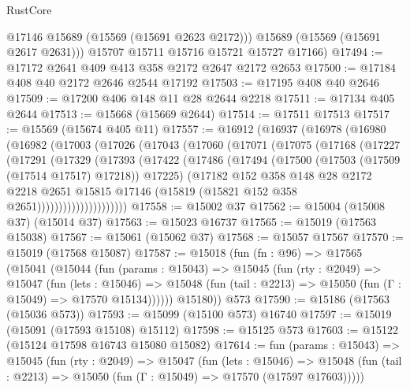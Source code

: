 \begin{lexlean}{RustCore}
\begin{coremodule}
          @17146
          @15689
          (@15569 (@15691 @2623 @2172)))
        @15689
        (@15569 (@15691 @2617 @2631)))
      @15707
      @15711
      @15716
      @15721
      @15727
      @17166)
@17494 := @17172 @2641 @409 @413 @358 @2172 @2647 @2172 @2653
@17500 := @17184 @408 @40 @2172 @2646 @2544 @17192
@17503 := @17195 @408 @40 @2646
@17509 := @17200 @406 @148 @11 @28 @2644 @2218
@17511 := @17134 @405 @2644
@17513 := @15668 (@15669 @2644)
@17514 := @17511 @17513
@17517 := @15569 (@15674 @405 @11)
@17557 := @16912
    (@16937
      (@16978
        (@16980
          (@16982
            (@17003
              (@17026
                (@17043
                  (@17060
                    (@17071
                      (@17075
                        (@17168
                          (@17227
                            (@17291
                              (@17329
                                (@17393
                                  (@17422
                                    (@17486
                                      (@17494
                                        (@17500 (@17503 (@17509 (@17514 @17517) @17218)) @17225)
                                        (@17182
                                          @152
                                          @358
                                          @148
                                          @28
                                          @2172
                                          @2218
                                          @2651
                                          @15815
                                          @17146
                                          (@15819 (@15821 @152 @358 @2651)))))))))))))))))))))
@17558 := @15002 @37
@17562 := @15004 (@15008 @37) (@15014 @37)
@17563 := @15023 @16737
@17565 := @15019 (@17563 @15038)
@17567 := @15061 (@15062 @37)
@17568 := @15057 @17567
@17570 := @15019 (@17568 @15087)
@17587 := @15018
    (fun (fn : @96) =>
    @17565
      (@15041
        (@15044
          (fun (params : @15043) =>
          @15045
            (fun (rty : @2049) =>
            @15047
              (fun (lets : @15046) =>
              @15048 (fun (tail : @2213) => @15050 (fun (Γ : @15049) => @17570 @15134))))))
        @15180))
    @573
@17590 := @15186 (@17563 (@15036 @573))
@17593 := @15099 (@15100 @573) @16740
@17597 := @15019 (@15091 (@17593 @15108) @15112)
@17598 := @15125 @573
@17603 := @15122 (@15124 @17598 @16743 @15080 @15082)
@17614 := fun (params : @15043) =>
  @15045
    (fun (rty : @2049) =>
    @15047
      (fun (lets : @15046) =>
      @15048 (fun (tail : @2213) => @15050 (fun (Γ : @15049) => @17570 (@17597 @17603)))))

\end{coremodule}
\end{lexlean}
